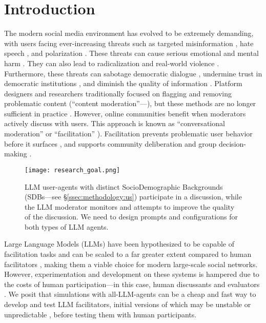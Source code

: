 %
\section{Introduction}
\label{sec:introduction}

The modern social media environment has evolved to be extremely demanding, with users facing ever-increasing threats such as targeted misinformation \cite{clemons2025disinformation, Denniss2025Social}, hate speech \cite{kolluri2025parler}, and polarization \cite{pranesh2024impactsocialmediapolarization}. 
These threats can cause serious emotional and mental harm \citep{proactive_moderation}. They can also lead to radicalization \citep{cho-etal-2024-language} and real-world violence \citep{schaffner_community_guidelines}. Furthermore, these threats can sabotage democratic dialogue \citep{esau2017design, falk-etal-2021-predicting, seering_self_moderation}, undermine trust in democratic institutions \citep{schroeder-etal-2024-fora}, and diminish the quality of information \citep{make_reddit_great}.
Platform designers and researchers traditionally focused on flagging and removing problematic content (``content moderation''---\citet{seering_self_moderation, cresci_pesonalized_interventions}), but these methods are no longer sufficient in practice \cite{horta_automated_moderation, schaffner_community_guidelines, small-polis-llm, korre2025evaluation}.  However, online communities benefit when moderators actively discuss with users. This approach is known as ``conversational moderation'' or ``facilitation'' \citep{argyle2023, korre2025evaluation, falk-etal-2021-predicting}). Facilitation prevents problematic user behavior before it surfaces \citep{cho-etal-2024-language, seering_self_moderation, cresci_pesonalized_interventions, make_reddit_great}, and supports community deliberation and group decision-making \citep{kim_et_al_chatbot, seering_self_moderation}.  

\begin{figure}[t]
	\centering
	\texttt{[image: research\_goal.png]}
	\caption{LLM user-agents with distinct SocioDemographic Backgrounds (SDBs---see \S\ref{ssec:methodology:us}) participate in a discussion, while the LLM moderator monitors and attempts to improve the quality of the discussion. We need to design prompts and configurations for both types of LLM agents.}
	\label{fig::goals}
\end{figure}

Large Language Models (LLMs) have been hypothesized to be capable of facilitation tasks and can be scaled to a far greater extent compared to human facilitators \cite{korre2025evaluation, small-polis-llm}, making them a viable choice for modern large-scale social networks. However, experimentation and development on these systems is hampered due to the costs of human participation---in this case, human discussants and evaluators \citep{rossi_2024}. We posit that simulations with all-LLM-agents can be a cheap and fast way to develop and test LLM facilitators, initial versions of which may be unstable or unpredictable \cite{atil_2025, rossi_2024}, before testing them with human participants. 

